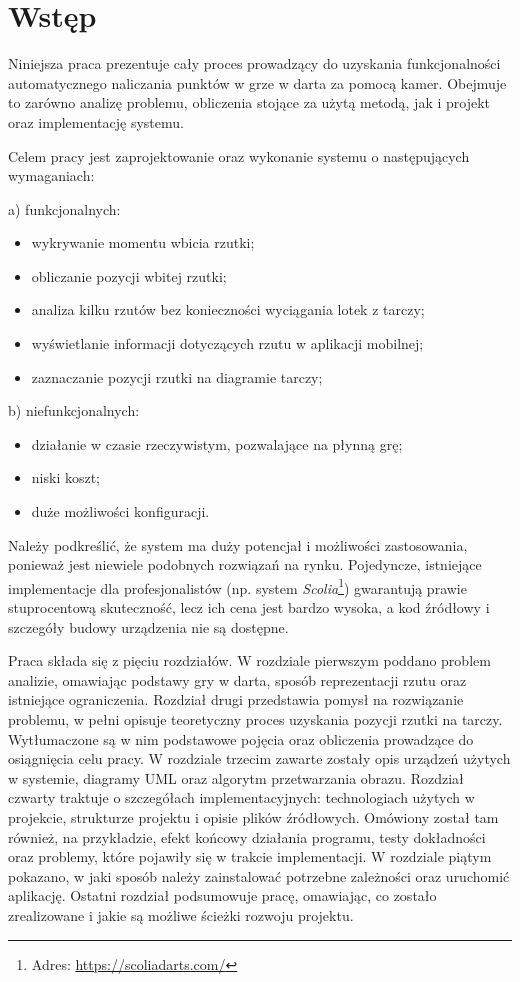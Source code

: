 \chapter{Wstęp}
\thispagestyle{chapterBeginStyle}

Niniejsza praca prezentuje cały proces prowadzący do uzyskania funkcjonalności automatycznego naliczania punktów w grze w darta za pomocą kamer. Obejmuje to zarówno analizę problemu, obliczenia stojące za użytą metodą, jak i projekt oraz implementację systemu. 

Celem pracy jest zaprojektowanie oraz wykonanie systemu o następujących wymaganiach:
\vspace{2mm}

\noindent a) funkcjonalnych:
\begin{itemize}
  \item wykrywanie momentu wbicia rzutki;
  \item obliczanie pozycji wbitej rzutki;
  \item analiza kilku rzutów bez konieczności wyciągania lotek z tarczy;
  \item wyświetlanie informacji dotyczących rzutu w aplikacji mobilnej;
  \item zaznaczanie pozycji rzutki na diagramie tarczy;
  
\end{itemize}

\noindent b) niefunkcjonalnych:
\begin{itemize}
  \item działanie w czasie rzeczywistym, pozwalające na płynną grę;
  \item niski koszt;
  \item duże możliwości konfiguracji.
\end{itemize}

Należy podkreślić, że system ma duży potencjał i możliwości zastosowania, ponieważ jest niewiele podobnych rozwiązań na rynku. Pojedyncze, istniejące implementacje dla profesjonalistów (np. system \textit{Scolia}\footnote{Adres: \url{https://scoliadarts.com/}}) gwarantują prawie stuprocentową skuteczność, lecz ich cena jest bardzo wysoka, a kod źródłowy i szczegóły budowy urządzenia nie są dostępne.

Praca składa się z pięciu rozdziałów. W rozdziale pierwszym poddano problem analizie, omawiając podstawy gry w darta, sposób reprezentacji rzutu oraz istniejące ograniczenia. Rozdział drugi przedstawia pomysł na rozwiązanie problemu, w pełni opisuje teoretyczny proces uzyskania pozycji rzutki na tarczy. Wytłumaczone są w nim podstawowe pojęcia oraz obliczenia prowadzące do osiągnięcia celu pracy. W rozdziale trzecim zawarte zostały opis urządzeń użytych w systemie, diagramy UML oraz algorytm przetwarzania obrazu. Rozdział czwarty traktuje o szczegółach implementacyjnych: technologiach użytych w projekcie, strukturze projektu i opisie plików źródłowych. Omówiony został tam również, na przykładzie, efekt końcowy działania programu, testy dokładności oraz problemy, które pojawiły się w trakcie implementacji. W rozdziale piątym pokazano, w jaki sposób należy zainstalować potrzebne zależności oraz uruchomić aplikację. Ostatni rozdział podsumowuje pracę, omawiając, co zostało zrealizowane i jakie są możliwe ścieżki rozwoju projektu.